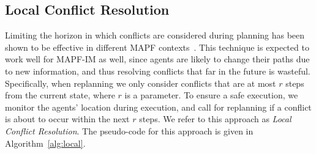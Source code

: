 \documentclass[letterpaper]{article} %
\def\
UrlFont{\rm}  %
\theoremstyle{definition}
\begin{document}
\subsection{Local Conflict Resolution}
\label{scn:local}
Limiting the horizon in which conflicts are considered during planning has been shown to be effective in different MAPF contexts~\cite{silver2005cooperative,li2021lifelong}. This technique is expected to work well for MAPF-IM as well, since agents are likely to change their paths due to new information, and thus resolving conflicts that far in the future is wasteful. Specifically, when replanning we only consider conflicts that are at most $r$ steps from the current state, where $r$ is a parameter. To ensure a safe execution, we monitor the agents' location during execution, and call for replanning if a conflict is about to occur within the next $r$ steps. 
We refer to this approach as \emph{Local Conflict Resolution}. The pseudo-code for this approach is given in Algorithm~\ref{alg:local}. %


\end{document}
